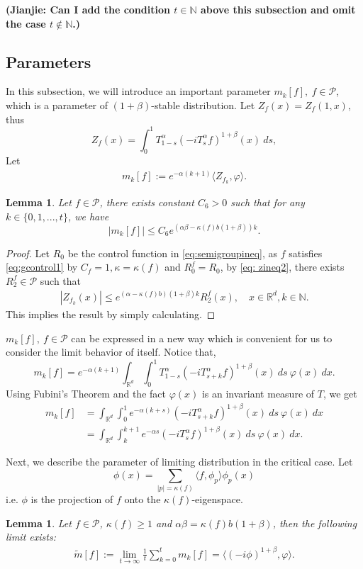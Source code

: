 \documentclass[12pt,oneside,english]{amsart}
\theoremstyle{plain}
\newtheorem{lem}[thm]{Lemma}
\theoremstyle{definition}
\numberwithin{equation}{section}
\begin{document}
{\bf (Jianjie: Can I add the condition $t\in \mathbb{N}$ above this subsection and omit the case $t \notin \mathbb{N}$.)}
\subsection{Parameters}
 In this subsection, we will introduce an important parameter $m_k[f],~f\in\mathcal{P}$, which is a parameter of $(1+\beta)$-stable distribution. Let $Z_f(x)=Z_f(1,x)$, thus
 $$Z_f(x)=\int_0^1 T^{\alpha}_{1-s}(-iT_s^{\alpha}f)^{1+\beta}(x)~ds,$$
 Let
 \begin{align}
      m_k[f]:=e^{-\alpha(k+1)}\langle Z_{f_k},\varphi\rangle.
 \end{align}
\begin{lem}\label{mgineq1}
Let $f\in\mathcal{P}$, there exists constant $C_6>0$ such that for any $k\in \{0,1,...,t\}$, we have
$$|m_k[f]|\leq C_6 e^{(\alpha\beta-\kappa(f)b(1+\beta))k}.$$
\end{lem}
\begin{proof}
Let $R_0$ be the control function in \eqref{eq:semigroupineq}, as $f$ satisfies \eqref{eq:gcontrol1} by $C_f=1, \kappa=\kappa(f)$ and $R_0^f=R_0$, by \eqref{eq: zineq2}, there exists $R_2^f\in \mathcal{P}$ such that 
\begin{align}
    |Z_{f_k}(x)|\leq e^{(\alpha-\kappa(f)b)(1+\beta)k}R_2^f(x), \quad x\in \mathbb{R}^d, k\in\mathbb{N}.
\end{align}
This implies the result by simply calculating.
\end{proof}

$m_k[f],~f\in \mathcal{P}$ can be expressed in a new way which is convenient for us to consider the limit behavior of itself. Notice that,
$$m_k[f]=e^{-\alpha(k+1)}\int_{\mathbb{R}^d}\int_0^1 T_{1-s}^{\alpha}(-iT_{s+k}^{\alpha}f)^{1+\beta}(x)~ds~\varphi(x)~dx.$$
Using Fubini's Theorem and the fact $\varphi(x)$ is an invariant measure of $T$, we get
\begin{align}
    m_k[f]&=\int_{\mathbb{R}^d}\int_0^1 e^{-\alpha(k+s)}(-iT_{s+k}^{\alpha}f)^{1+\beta}(x)~ds~\varphi(x)~dx\nonumber\\
    &=\int_{\mathbb{R}^d}\int_k^{k+1} e^{-\alpha s}(-iT_{s}^{\alpha}f)^{1+\beta}(x)~ds~\varphi(x)~dx.\label{mkeq}
\end{align}

Next, we describe the parameter of limiting distribution in the critical case. Let
$$\phi(x)=\sum_{|p|=\kappa(f)}\langle f, \phi_p\rangle\phi_p(x)$$
i.e. $\phi$ is the projection of $f$ onto the $\kappa(f)$-eigenspace.
\begin{lem}\label{lemma210}
Let $f \in \mathcal{P}$, $\kappa(f)\geq 1$ and $\alpha\beta=\kappa(f)b(1+\beta)$, then the following limit exists:
\begin{align}
    \tilde{m}[f]:=\lim_{t\rightarrow \infty}\frac{1}{t}\sum_{k=0}^{t}m_k[f]=\langle(-i\phi)^{1+\beta},\varphi\rangle.
\end{align}
\end{lem}
\end{document}
